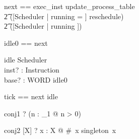 \documentclass{article}
\begin{document}
\begin{zed}
  next == exec\_inst \pipe update\_process\_table \semi\\
    \t2 ([\Delta Scheduler | running = \emptyset] \land reschedule) \lor\\
    \t2 ([\Xi Scheduler | running \neq \emptyset])
\end{zed}

\begin{zed}
  idle0 == \lnot \pre next
\end{zed}

\begin{schema}{idle}
  \Xi Scheduler\\
  inst? : Instruction\\
  base? : WORD
\where
  idle0
\end{schema}

\begin{zed}
  tick == next \lor idle
\end{zed}

\begin{theorem}{conj1}
  \vdash? (\forall n : \nat_1 @ n > 0)
\end{theorem}

\begin{theorem}{conj2} [X] 
  \vdash? \forall x : \power X @ \#~x  \iff singleton~x
\end{theorem}
\end{document}
